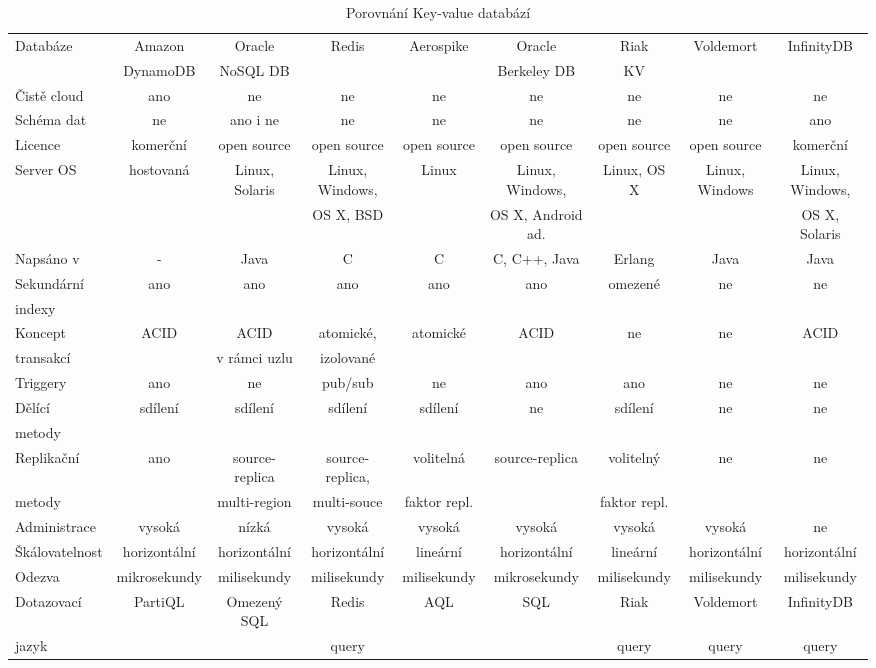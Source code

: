 \documentclass[czech,bachelor,dept460,male,csharp,cpdeclaration]{diploma}
\begin{document}
\begin{sidewaystable}
		\centering
		\caption{Porovnání Key-value databází}
		\label{tab_kvdb_compare}
		\scalebox{0.8}
		{
		\begin{tabular}{ l|c c c c c c c c } 
			\toprule
			Databáze & Amazon & Oracle & Redis & Aerospike & Oracle & Riak & Voldemort & InfinityDB \\
			& DynamoDB & NoSQL DB & & & Berkeley DB & KV & & \\
			\midrule
			Čistě cloud & ano & ne & ne & ne & ne & ne & ne & ne \\
			Schéma dat & ne & ano i ne & ne & ne & ne & ne & ne & ano \\
			Licence & komerční & open source & open source & open source & open source & open source & open source & komerční \\
			Server OS & hostovaná & Linux, Solaris & Linux, Windows, & Linux & Linux, Windows, & Linux, OS X & Linux, Windows &  Linux, Windows, \\
			& & & OS X, BSD & & OS X, Android ad. & & & OS X, Solaris\\
			Napsáno v & - & Java & C & C & C, C++, Java & Erlang & Java & Java\\
			Sekundární & ano & ano & ano & ano & ano & omezené & ne & ne \\
			indexy & & & & & & & & \\
			Koncept & ACID & ACID & atomické, & atomické & ACID & ne & ne & ACID \\
			transakcí & & v rámci uzlu & izolované & & & & & \\
			Triggery & ano & ne & pub/sub & ne & ano & ano & ne & ne \\
			Dělící & sdílení & sdílení & sdílení & sdílení & ne & sdílení & ne & ne \\ 
			metody \\
			Replikační & ano & source-replica & source-replica, & volitelná & source-replica & volitelný & ne & ne \\
			metody & & multi-region & multi-souce & faktor repl. & & faktor repl. \\
			Administrace & vysoká & nízká & vysoká & vysoká & vysoká & vysoká & vysoká & ne\\
			Škálovatelnost & horizontální & horizontální & horizontální & lineární & horizontální & lineární & horizontální & horizontální\\
			Odezva & mikrosekundy & milisekundy & milisekundy & milisekundy & mikrosekundy & milisekundy & milisekundy & milisekundy \\
			Dotazovací & PartiQL & Omezený SQL & Redis & AQL & SQL & Riak & Voldemort & InfinityDB \\
			jazyk & & & query & & & query & query & query \\
			\bottomrule
		\end{tabular}
		}
\end{sidewaystable}
	
\end{document}
